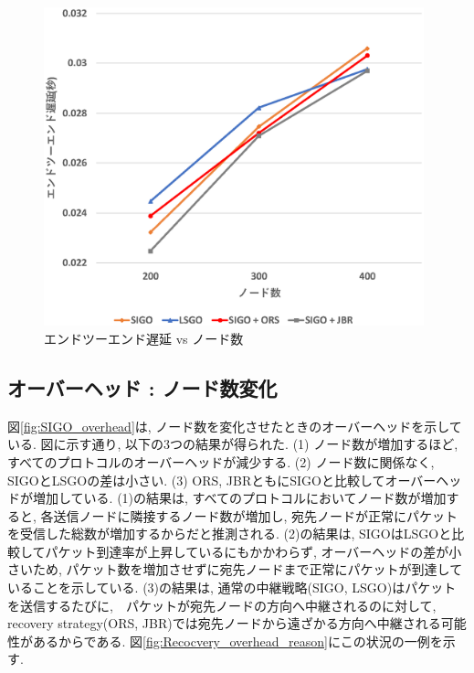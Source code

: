 \documentclass[10pt]{jreport}
\begin{document}
\begin{figure}[!ht]
	\centering
	\includegraphics[width=110mm]{figures/SIGO_delay_num.eps}
	\caption{エンドツーエンド遅延 vs ノード数}
	\label{fig:SIGO_delay_num}
\end{figure}

\subsection{オーバーヘッド : ノード数変化}

図\ref{fig:SIGO_overhead}は, ノード数を変化させたときのオーバーヘッドを示している.
図に示す通り, 以下の3つの結果が得られた.
(1) ノード数が増加するほど, すべてのプロトコルのオーバーヘッドが減少する.
(2) ノード数に関係なく, SIGOとLSGOの差は小さい. 
(3) ORS, JBRともにSIGOと比較してオーバーヘッドが増加している. 
(1)の結果は, すべてのプロトコルにおいてノード数が増加すると, 各送信ノードに隣接するノード数が増加し, 宛先ノードが正常にパケットを受信した総数が増加するからだと推測される.
(2)の結果は, SIGOはLSGOと比較してパケット到達率が上昇しているにもかかわらず, オーバーヘッドの差が小さいため, パケット数を増加させずに宛先ノードまで正常にパケットが到達していることを示している. 
(3)の結果は, 通常の中継戦略(SIGO, LSGO)はパケットを送信するたびに,　パケットが宛先ノードの方向へ中継されるのに対して, recovery strategy(ORS, JBR)では宛先ノードから遠ざかる方向へ中継される可能性があるからである.
図\ref{fig:Recocvery_overhead_reason}にこの状況の一例を示す.
\end{document}
